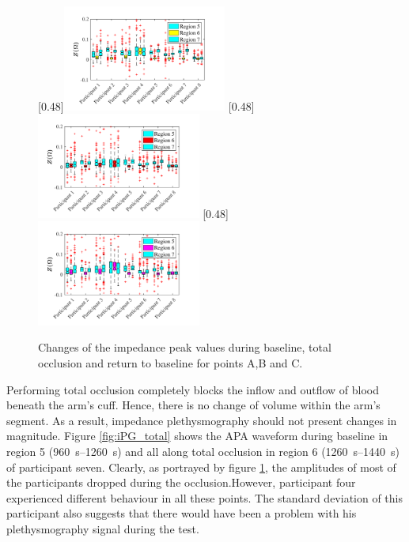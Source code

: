 \begin{figure}
	\null\hfill%
	[0.48\textwidth]{\includegraphics[width=0.48\textwidth, trim={0.5cm 0cm 1.5cm 0 cm}, clip]{figure_apa_7a}}%
	\hfill%
	[0.48\textwidth]{\includegraphics[width=0.48\textwidth, trim={0.5cm 0cm 1.5cm 0 cm}, clip]{figure_apa_7b}}%
	\hfill%
	[0.48\textwidth]{\includegraphics[width=0.48\textwidth, trim={0.5cm 0cm 1.5cm 0 cm}, clip]{figure_apa_7c}}%
	\null%
	\caption{Changes of the impedance peak values during baseline, total occlusion and return to baseline for points A,B and C.}
	\label{fig:iPG_change_points_total}
\end{figure}

Performing total occlusion completely blocks the inflow and outflow of blood beneath the arm's cuff.  Hence, there is no change of volume within the arm's segment. As a result, impedance plethysmography should not present changes in magnitude.  Figure \ref{fig:iPG_total} shows the APA waveform during baseline in region 5 (\SIrange{960}{1260}{\second}) and all along total occlusion in region 6  (\SIrange{1260}{1440}{\second}) of participant seven. Clearly, as portrayed by figure \ref{fig:iPG_change_points_total}, the amplitudes of most of the participants dropped during the occlusion.However, participant four experienced different behaviour in all these points. The standard deviation of this participant also suggests that there would have been a problem with his plethysmography signal during the test. 

